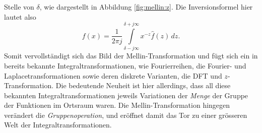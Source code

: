 Stelle von $\delta$, wie dargestellt in Abbildung \ref{fig:mellin:z}.
Die Inversionsformel hier lautet also
\begin{equation}
    f(x) 
    = \frac{1}{2\pi j} 
    \int\limits_{\delta -j\infty}^{\delta +j\infty} 
    x^{-z} \hat{f}(z) \,{d}z
    .
    \label{mellin:mellininv}
\end{equation}
Somit vervollständigt sich das Bild der Mellin-Transformation und fügt 
sich ein in bereits bekannte Integraltransformationen, wie Fourierreihen, 
die Fourier- und Laplacetransformationen sowie deren diskrete Varianten, 
die DFT und $z$-Transformation. Die bedeutende Neuheit ist hier allerdings, 
dass all diese bekannten Integraltransformationen jeweils Variationen der 
{\em Menge} der Gruppe der Funktionen im Ortsraum waren.
Die Mellin-Transformation hingegen verändert die {\em Gruppenoperation}, 
und eröffnet damit das Tor zu einer grösseren Welt der 
Integraltransformationen.




